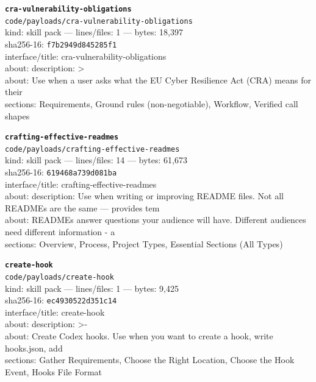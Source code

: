 \noindent\textbf{\texttt{cra-vulnerability-obligations}}\\
\texttt{code/payloads/cra-vulnerability-obligations}\\
kind: skill pack --- lines/files: 1 --- bytes: 18,397\\
sha256-16: \texttt{f7b2949d845285f1}\\
interface/title: cra-vulnerability-obligations\\
about: description: >\\
about: Use when a user asks what the EU Cyber Resilience Act (CRA) means for their\\
sections: Requirements, Ground rules (non-negotiable), Workflow, Verified call shapes\\
\vspace*{6.0pt}

\noindent\textbf{\texttt{crafting-effective-readmes}}\\
\texttt{code/payloads/crafting-effective-readmes}\\
kind: skill pack --- lines/files: 14 --- bytes: 61,673\\
sha256-16: \texttt{619468a739d081ba}\\
interface/title: crafting-effective-readmes\\
about: description: Use when writing or improving README files. Not all READMEs are the same — provides tem\\
about: READMEs answer questions your audience will have. Different audiences need different information - a\\
sections: Overview, Process, Project Types, Essential Sections (All Types)\\
\vspace*{6.0pt}

\noindent\textbf{\texttt{create-hook}}\\
\texttt{code/payloads/create-hook}\\
kind: skill pack --- lines/files: 1 --- bytes: 9,425\\
sha256-16: \texttt{ec4930522d351c14}\\
interface/title: create-hook\\
about: description: >-\\
about: Create Codex hooks. Use when you want to create a hook, write hooks.json, add\\
sections: Gather Requirements, Choose the Right Location, Choose the Hook Event, Hooks File Format\\
\vspace*{6.0pt}
\newpage

